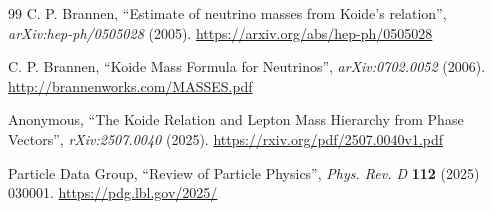 	\begin{thebibliography}{99}
		C. P. Brannen, ``Estimate of neutrino masses from Koide's relation'', \textit{arXiv:hep-ph/0505028} (2005).
		\url{https://arxiv.org/abs/hep-ph/0505028}
		
		C. P. Brannen, ``Koide Mass Formula for Neutrinos'', \textit{arXiv:0702.0052} (2006).
		\url{http://brannenworks.com/MASSES.pdf}
		
		Anonymous, ``The Koide Relation and Lepton Mass Hierarchy from Phase Vectors'', \textit{rXiv:2507.0040} (2025).
		\url{https://rxiv.org/pdf/2507.0040v1.pdf}
		
		Particle Data Group, ``Review of Particle Physics'', \textit{Phys. Rev. D} \textbf{112} (2025) 030001.
		\url{https://pdg.lbl.gov/2025/}
		
	\end{thebibliography}
	